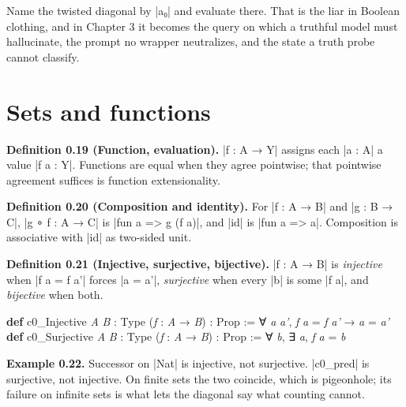 \documentclass{memoir}
\begin{document}
Name the twisted diagonal by \LeanVerb|a₀| and evaluate there. That is the liar in
Boolean clothing, and in Chapter 3 it becomes the query on which a truthful
model must hallucinate, the prompt no wrapper neutralizes, and the state a truth
probe cannot classify.



\section{Sets and functions}\label{Two--Schemas--of--Impossibility-005F-005F-005F--Machine--Checked--Limits--of--Trustworthy--Machine--Learning-005F-005F-005F--and--Why--They--Tighten--with--Capability----Preliminaries----Sets--and--functions}

\textbf{Definition 0.19 (Function, evaluation).} \LeanVerb|f : A → Y| assigns each \LeanVerb|a : A| a
value \LeanVerb|f a : Y|. Functions are equal when they agree pointwise; that pointwise
agreement suffices is function extensionality.

\textbf{Definition 0.20 (Composition and identity).} For \LeanVerb|f : A → B| and \LeanVerb|g : B → C|,
\LeanVerb|g ∘ f : A → C| is \LeanVerb|fun a => g (f a)|, and \LeanVerb|id| is \LeanVerb|fun a => a|. Composition is
associative with \LeanVerb|id| as two-sided unit.

\textbf{Definition 0.21 (Injective, surjective, bijective).} \LeanVerb|f : A → B| is \emph{injective}
when \LeanVerb|f a = f a'| forces \LeanVerb|a = a'|, \emph{surjective} when every \LeanVerb|b| is some \LeanVerb|f a|,
and \emph{bijective} when both.

\begin{LeanVerbatim}
\textbf{def} c0_Injective \textit{A} \textit{B} : Type (\textit{f} : \textit{A} → \textit{B}) : Prop :=
  ∀ \textit{a} \textit{a'}, \textit{f} \textit{a} = \textit{f} \textit{a'} → \textit{a} = \textit{a'}
\textbf{def} c0_Surjective \textit{A} \textit{B} : Type (\textit{f} : \textit{A} → \textit{B}) : Prop :=
  ∀ \textit{b}, ∃ \textit{a}, \textit{f} \textit{a} = \textit{b}

\end{LeanVerbatim}


\textbf{Example 0.22.} Successor on \LeanVerb|Nat| is injective, not surjective. \LeanVerb|c0_pred| is
surjective, not injective. On finite sets the two coincide, which is pigeonhole;
its failure on infinite sets is what lets the diagonal say what counting cannot.
\end{document}
